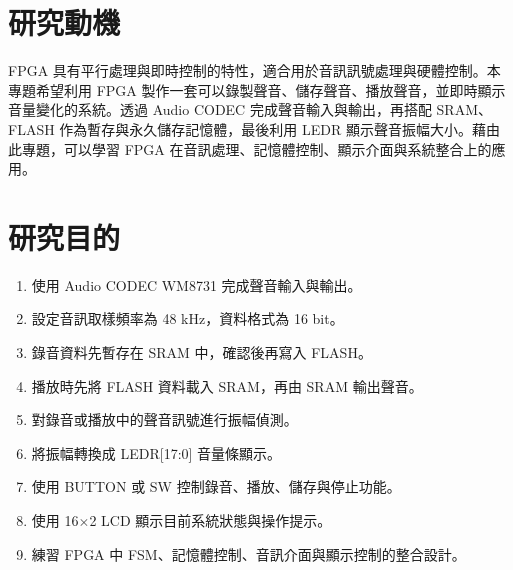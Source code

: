\section{研究動機}

FPGA 具有平行處理與即時控制的特性，適合用於音訊訊號處理與硬體控制。本專題希望利用 FPGA 製作一套可以錄製聲音、儲存聲音、播放聲音，並即時顯示音量變化的系統。透過 Audio CODEC 完成聲音輸入與輸出，再搭配 SRAM、FLASH 作為暫存與永久儲存記憶體，最後利用 LEDR 顯示聲音振幅大小。藉由此專題，可以學習 FPGA 在音訊處理、記憶體控制、顯示介面與系統整合上的應用。

\section{研究目的}

\begin{enumerate}
    \item 使用 Audio CODEC WM8731 完成聲音輸入與輸出。
    \item 設定音訊取樣頻率為 48 kHz，資料格式為 16 bit。
    \item 錄音資料先暫存在 SRAM 中，確認後再寫入 FLASH。
    \item 播放時先將 FLASH 資料載入 SRAM，再由 SRAM 輸出聲音。
    \item 對錄音或播放中的聲音訊號進行振幅偵測。
    \item 將振幅轉換成 LEDR[17:0] 音量條顯示。
    \item 使用 BUTTON 或 SW 控制錄音、播放、儲存與停止功能。
    \item 使用 16$\times$2 LCD 顯示目前系統狀態與操作提示。
    \item 練習 FPGA 中 FSM、記憶體控制、音訊介面與顯示控制的整合設計。
\end{enumerate}
